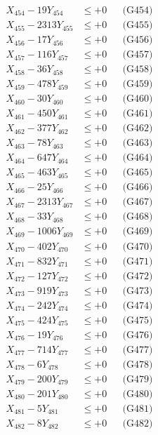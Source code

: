 \documentclass[a4paper,10pt]{article}
\begin{document}
{\begin{align}
X_{454} - 19Y_{454} &\leq +0 && \text{(G454)} \\
X_{455} - 2313Y_{455} &\leq +0 && \text{(G455)} \\
X_{456} - 17Y_{456} &\leq +0 && \text{(G456)} \\
X_{457} - 116Y_{457} &\leq +0 && \text{(G457)} \\
X_{458} - 36Y_{458} &\leq +0 && \text{(G458)} \\
X_{459} - 478Y_{459} &\leq +0 && \text{(G459)} \\
X_{460} - 30Y_{460} &\leq +0 && \text{(G460)} \\
\allowbreak
X_{461} - 450Y_{461} &\leq +0 && \text{(G461)} \\
X_{462} - 377Y_{462} &\leq +0 && \text{(G462)} \\
X_{463} - 78Y_{463} &\leq +0 && \text{(G463)} \\
X_{464} - 647Y_{464} &\leq +0 && \text{(G464)} \\
X_{465} - 463Y_{465} &\leq +0 && \text{(G465)} \\
X_{466} - 25Y_{466} &\leq +0 && \text{(G466)} \\
X_{467} - 2313Y_{467} &\leq +0 && \text{(G467)} \\
X_{468} - 33Y_{468} &\leq +0 && \text{(G468)} \\
X_{469} - 1006Y_{469} &\leq +0 && \text{(G469)} \\
X_{470} - 402Y_{470} &\leq +0 && \text{(G470)} \\
\allowbreak
X_{471} - 832Y_{471} &\leq +0 && \text{(G471)} \\
X_{472} - 127Y_{472} &\leq +0 && \text{(G472)} \\
X_{473} - 919Y_{473} &\leq +0 && \text{(G473)} \\
X_{474} - 242Y_{474} &\leq +0 && \text{(G474)} \\
X_{475} - 424Y_{475} &\leq +0 && \text{(G475)} \\
X_{476} - 19Y_{476} &\leq +0 && \text{(G476)} \\
X_{477} - 714Y_{477} &\leq +0 && \text{(G477)} \\
X_{478} - 6Y_{478} &\leq +0 && \text{(G478)} \\
X_{479} - 200Y_{479} &\leq +0 && \text{(G479)} \\
X_{480} - 201Y_{480} &\leq +0 && \text{(G480)} \\
\allowbreak
X_{481} - 5Y_{481} &\leq +0 && \text{(G481)} \\
X_{482} - 8Y_{482} &\leq +0 && \text{(G482)} \\

\end{align}}
\end{document}
